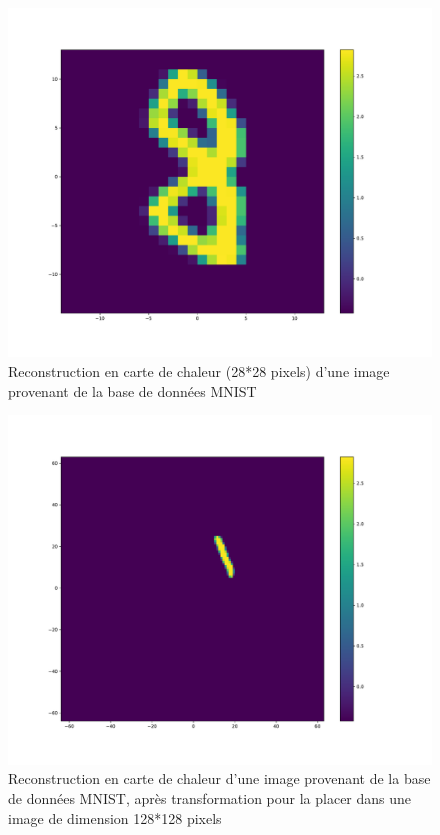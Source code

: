 \begin{figure}[th]
\centering
\includegraphics[scale=0.3]{Figures/MNIST_28}
\decoRule %
\caption[Figure]{Reconstruction en carte de chaleur (28*28 pixels) d'une image provenant de la base de données MNIST}
\label{fig:MNIST_28}
\end{figure}

\begin{figure}[th]
\centering
\includegraphics[scale=0.3]{Figures/MNIST_128}
\decoRule
\caption[Figure]{Reconstruction en carte de chaleur d'une image provenant de la base de données MNIST, après transformation pour la placer dans une image de dimension 128*128 pixels}
\label{fig:MNIST_128}
\end{figure}

